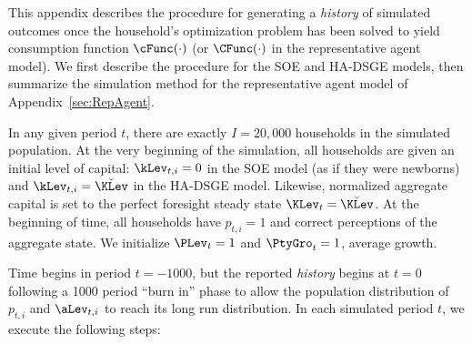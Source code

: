 
This appendix describes the procedure for generating a \textit{history}
of simulated outcomes once the household's optimization problem has
been solved to yield consumption function $\cFunc(\cdot)$ (or $\CFunc(\cdot)$
in the representative agent model).  We first describe the procedure for
the SOE and HA-DSGE models, then summarize
the simulation method for the representative agent model of Appendix~\ref{sec:RepAgent}.

In any given period $t$, there are exactly $I=20,000$ households in
the simulated population.  At the very beginning of the simulation, all households
are given an initial level of capital: $\kLev_{t,i} = 0$ in the SOE model (as if
they were newborns) and $\kLev_{t,i} = \breve{\KLev}$ in the HA-DSGE model.
Likewise, normalized aggregate capital is set to the perfect foresight
steady state $\KLev_t = \breve{\KLev}$.  At the beginning of time, all households
have $p_{t,i} = 1$ and correct perceptions of the aggregate state.
We initialize $\PLev_t=1$ and $\PtyGro_t=1$, average growth.

Time begins in period $t=-1000$, but the reported \textit{history}
begins at $t=0$ following a 1000 period ``burn in'' phase to allow the
population distribution of $p_{t,i}$ and $\aLev_{t,i}$ to reach its
long run distribution.  In each simulated period $t$, we execute the following steps:

